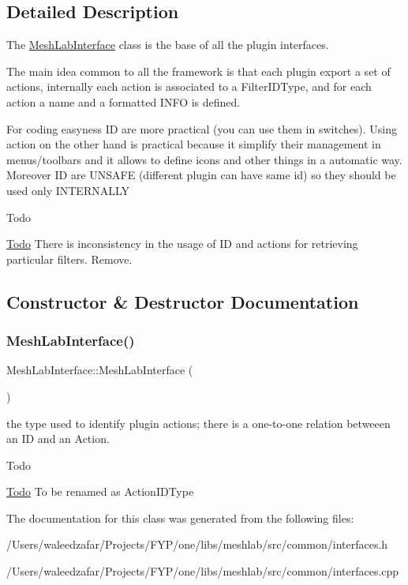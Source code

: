 \subsection{Detailed Description}
The \hyperlink{class_mesh_lab_interface}{Mesh\+Lab\+Interface} class is the base of all the plugin interfaces. 

The main idea common to all the framework is that each plugin export a set of actions, internally each action is associated to a Filter\+I\+D\+Type, and for each action a name and a formatted I\+N\+FO is defined.

For coding easyness ID are more practical (you can use them in switches). Using action on the other hand is practical because it simplify their management in menus/toolbars and it allows to define icons and other things in a automatic way. Moreover ID are U\+N\+S\+A\+FE (different plugin can have same id) so they should be used only I\+N\+T\+E\+R\+N\+A\+L\+LY

\begin{DoxyRefDesc}{Todo}
\item[\hyperlink{todo__todo000001}{Todo}]There is inconsistency in the usage of ID and actions for retrieving particular filters. Remove.\end{DoxyRefDesc}


\subsection{Constructor \& Destructor Documentation}
\mbox{\label{class_mesh_lab_interface_a233eea4713fe11e32e59294016c46f0f}} 
\subsubsection{\texorpdfstring{Mesh\+Lab\+Interface()}{MeshLabInterface()}}
{\footnotesize\ttfamily Mesh\+Lab\+Interface\+::\+Mesh\+Lab\+Interface (\begin{DoxyParamCaption}{ }\end{DoxyParamCaption})\hspace{0.3cm}{\ttfamily [inline]}}

the type used to identify plugin actions; there is a one-\/to-\/one relation betweeen an ID and an Action. \begin{DoxyRefDesc}{Todo}
\item[\hyperlink{todo__todo000002}{Todo}]To be renamed as Action\+I\+D\+Type \end{DoxyRefDesc}


The documentation for this class was generated from the following files\+:\begin{DoxyCompactItemize}
\item 
/\+Users/waleedzafar/\+Projects/\+F\+Y\+P/one/libs/meshlab/src/common/interfaces.\+h\item 
/\+Users/waleedzafar/\+Projects/\+F\+Y\+P/one/libs/meshlab/src/common/interfaces.\+cpp\end{DoxyCompactItemize}
